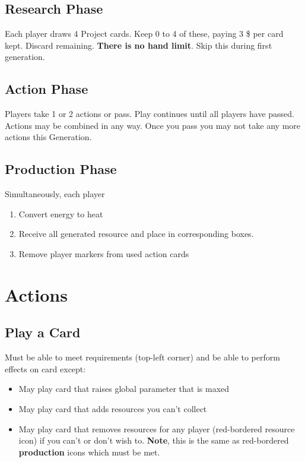 \documentclass[12pt]{article}
\newenvironment{enumerateCustom}
{\begin{enumerate}
  \setlength{\itemsep}{1pt}
  \setlength{\parskip}{0pt}
  \setlength{\parsep}{0pt}}
{\end{enumerate}}
\newenvironment{itemizeCustom}
{\begin{itemize}
  \setlength{\itemsep}{1pt}
  \setlength{\parskip}{0pt}
  \setlength{\parsep}{0pt}}
{\end{itemize}}
\begin{document}
\begin{multicols*}{2}
    \subsection*{Research Phase}
    Each player draws 4 Project cards. Keep 0 to 4 of these, paying 3 \$ per card kept. Discard remaining. \textbf{There is no hand limit}. Skip this during first generation.

    \subsection*{Action Phase}
    Players take 1 or 2 actions or pass. Play continues until all players have passed. Actions may be combined in any way. Once you pass you may not take any more actions this Generation.

    \subsection*{Production Phase}
    Simultaneously, each player
    \begin{enumerateCustom}
        \item Convert energy to heat
        \item Receive all generated resource and place in corresponding boxes.
        \item Remove player markers from used action cards
    \end{enumerateCustom}

\section*{Actions}
    \subsection*{Play a Card}
    Must be able to meet requirements (top-left corner) and be able to perform effects on card except:
    \begin{itemizeCustom}
        \item May play card that raises global parameter that is maxed
        \item May play card that adds resources you can't collect
        \item May play card that removes resources for any player (red-bordered resource icon) if you can't or don't wish to. \textbf{Note}, this is the same as red-bordered \textbf{production} icons which must be met.
    \end{itemizeCustom}


\end{multicols*}
\end{document}
